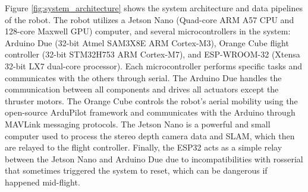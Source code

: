 \documentclass[letterpaper, 10 pt, conference]{ieeeconf}  %
\newcommand{\filip}[1]{{\color{green}#1}}
\begin{document}
Figure \ref{fig:system_architecture} shows the system architecture and data pipelines of the robot. The robot utilizes a Jetson Nano (Quad-core ARM A57 CPU and 128-core Maxwell GPU) computer, and several microcontrollers in the system: Arduino Due (32-bit Atmel SAM3X8E ARM Cortex-M3), Orange Cube flight controller (32-bit STM32H753 ARM Cortex-M7), and ESP-WROOM-32 (Xtensa 32-bit LX7 dual-core processor). Each microcontroller performs specific tasks and communicates with the others through serial. The Arduino Due handles the communication between all components and drives all actuators except the thruster motors. The Orange Cube controls the robot's aerial mobility using the open-source ArduPilot framework and communicates with the Arduino through MAVLink messaging protocols. The Jetson Nano is a powerful and small computer used to process the stereo depth camera data and SLAM, which then are relayed to the flight controller. Finally, the ESP32 acts as a simple relay between the Jetson Nano and Arduino Due due to incompatibilities with rosserial that sometimes triggered the system to reset, which can be dangerous if happened mid-flight.




\end{document}
